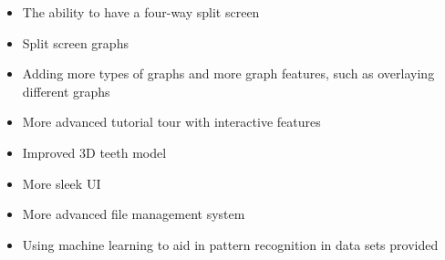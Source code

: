 \documentclass[11pt,english, titlepage]{article}
\begin{document}
  \begin{itemize}
    \item The ability to have a four-way split screen
    \item Split screen graphs
    \item Adding more types of graphs and more graph features, such as overlaying different graphs
    \item More advanced tutorial tour with interactive features
    \item Improved 3D teeth model
    \item More sleek UI
    \item More advanced file management system
    \item Using machine learning to aid in pattern recognition in data sets provided
  \end{itemize}
\end{document}

